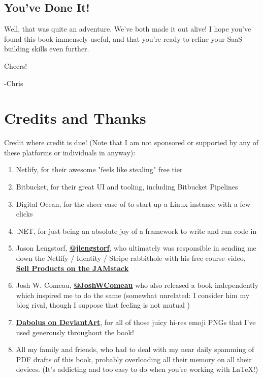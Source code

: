 \documentclass[paper=6in:9in,pagesize=pdftex,headinclude=on,footinclude=on,12pt,twoside]{scrbook}
\newcommand{\link}[2]{\textbf{\textcolor{monokaiPink}{\href{#2}{#1}}}}
\begin{document}
\section*{You've Done It!}

Well, that was quite an adventure. We've both made it out alive! I hope you've found this book immensely useful, and that you're ready to refine your SaaS building skills even further.

Cheers! \beers

-Chris

\chapter*{Credits and Thanks}

Credit where credit is due! (Note that I am not sponsored or supported by any of these platforms or individuals in anyway):

\begin{enumerate}
\item Netlify, for their awesome "feels like stealing" free tier
\item Bitbucket, for their great UI and tooling, including Bitbucket Pipelines
\item Digital Ocean, for the sheer ease of to start up a Linux instance with a few clicks
\item .NET, for just being an absolute joy of a framework to write and run code in
\item Jason Lengstorf, \link{@jlengstorf}{https://twitter.com/jlengstorf}, who ultimately was responsible in sending me down the Netlify / Identity / Stripe rabbithole with his free course video, \link{Sell Products on the JAMstack}{https://www.youtube.com/watch?v=0fQPbiqG9bY}
\item Josh W. Comeau, \link{@JoshWComeau}{https://twitter.com/JoshWComeau} who also released a book independently which inspired me to do the same (somewhat unrelated: I consider him my blog rival, though I suppose that feeling is not mutual \joy)
\item \link{Dabolus on DeviantArt}{https://www.deviantart.com/dabolus}, for all of those juicy hi-res emoji PNGs that I've used generously throughout the book!
\item All my family and friends, who had to deal with my near daily spamming of PDF drafts of this book, probably overloading all their memory on all their devices. (It's addicting and too easy to do when you're working with LaTeX!) 
\end{enumerate}
\end{document}
